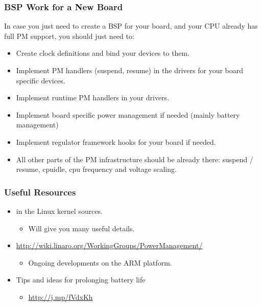 \begin{frame}
  \frametitle{BSP Work for a New Board}
  In case you just need to create a BSP for your board, and your
  CPU already has full PM support, you should just need to:
  \begin{itemize}
  \item Create clock definitions and bind your devices to them.
  \item Implement PM handlers (suspend, resume) in the drivers for
    your board specific devices.
  \item Implement runtime PM handlers in your drivers.
  \item Implement board specific power management if needed (mainly
    battery management)
  \item Implement regulator framework hooks for your board if
    needed.
  \item All other parts of the PM infrastructure should be already
    there: suspend / resume, cpuidle, cpu frequency and voltage
    scaling.
  \end{itemize}
\end{frame}

\begin{frame}
  \frametitle{Useful Resources}
  \begin{itemize}
  \item {} in the Linux kernel sources.
    \begin{itemize}
    \item Will give you many useful details.
    \end{itemize}
  \item {\small \url{http://wiki.linaro.org/WorkingGroups/PowerManagement/}}
    \begin{itemize}
    \item Ongoing developments on the ARM platform.
    \end{itemize}
  \item Tips and ideas for prolonging battery life
    \begin{itemize}
    \item \url{http://j.mp/fVdxKh}
    \end{itemize}
  \end{itemize}
\end{frame}

